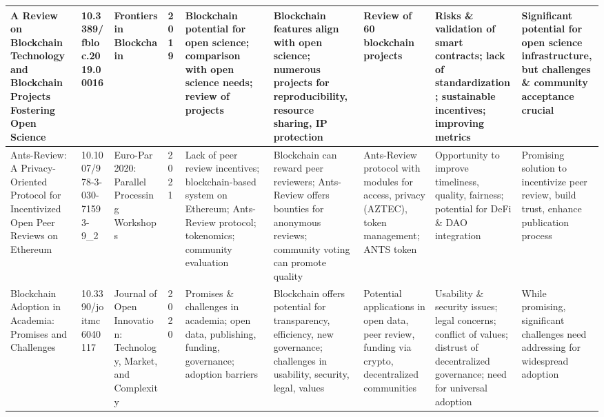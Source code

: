 \documentclass{article}
\begin{document}
\begin{landscape}
\begin{table}[ht]
\begin{tabularx}{\linewidth}{|p{3.5cm}|p{2.5cm}|p{3cm}|p{1.8cm}|X|X|X|X|X|}
            \hline
            A Review on Blockchain Technology and Blockchain Projects Fostering Open Science                                                   & 10.3389/fbloc.2019.00016      & Frontiers in Blockchain                                        & 2019                      & Blockchain potential for open science; comparison with open science needs; review of projects                               & Blockchain features align with open science; numerous projects for reproducibility, resource sharing, IP protection                            & Review of 60 blockchain projects                                                                        & Risks \& validation of smart contracts; lack of standardization; sustainable incentives; improving metrics                          & Significant potential for open science infrastructure, but challenges \& community acceptance crucial \\
            \hline
            Ants-Review: A Privacy-Oriented Protocol for Incentivized Open Peer Reviews on Ethereum                                            & 10.1007/978-3-030-71593-9\_2  & Euro-Par 2020: Parallel Processing Workshops                   & 2021                      & Lack of peer review incentives; blockchain-based system on Ethereum; Ants-Review protocol; tokenomics; community evaluation & Blockchain can reward peer reviewers; Ants-Review offers bounties for anonymous reviews; community voting can promote quality                  & Ants-Review protocol with modules for access, privacy (AZTEC), token management; ANTS token             & Opportunity to improve timeliness, quality, fairness; potential for DeFi \& DAO integration                                         & Promising solution to incentivize peer review, build trust, enhance publication process               \\
            \hline
            Blockchain Adoption in Academia: Promises and Challenges                                                                           & 10.3390/joitmc6040117         & Journal of Open Innovation: Technology, Market, and Complexity & 2020                      & Promises \& challenges in academia; open data, publishing, funding, governance; adoption barriers                           & Blockchain offers potential for transparency, efficiency, new governance; challenges in usability, security, legal, values                     & Potential applications in open data, peer review, funding via crypto, decentralized communities         & Usability \& security issues; legal concerns; conflict of values; distrust of decentralized governance; need for universal adoption & While promising, significant challenges need addressing for widespread adoption                       \\

\end{tabularx}
\end{table}
\end{landscape}
\end{document}
